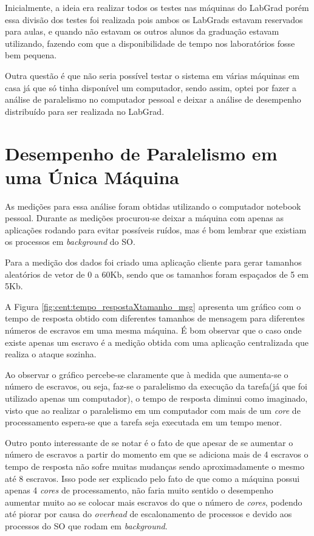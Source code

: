 \documentclass[
	12pt,				%
    oneside,			%
	a4paper,			%
	english,			%
	brazil,				%
	]{abntex2}
\begin{document}
Inicialmente, a ideia era realizar todos os testes nas máquinas do LabGrad porém essa divisão dos testes foi realizada pois ambos os LabGrads estavam reservados para aulas, e quando não estavam os outros alunos da graduação estavam utilizando, fazendo com que a disponibilidade de tempo nos laboratórios fosse bem pequena. 

Outra questão é que não seria possível testar o sistema em várias máquinas em casa já que só tinha disponível um computador, sendo assim, optei por fazer a análise de paralelismo no computador pessoal e deixar a análise de desempenho distribuído para ser realizada no LabGrad.

\section{Desempenho de Paralelismo em uma Única Máquina}

As medições para essa análise foram obtidas utilizando o computador notebook pessoal. Durante as medições procurou-se deixar
a máquina com apenas as aplicações rodando para evitar possíveis ruídos, mas é bom lembrar que existiam os processos em \textit{background} do SO. 

Para a medição dos dados foi criado uma aplicação cliente para gerar tamanhos aleatórios de vetor de 0 a 60Kb, sendo que os
tamanhos foram espaçados de 5 em 5Kb.

A Figura \ref{fig:cent:tempo_respostaXtamanho_msg} apresenta um gráfico com o tempo de resposta obtido com diferentes tamanhos de mensagem para diferentes números de escravos em uma mesma máquina. É bom observar que o caso onde existe apenas um escravo é a medição obtida com uma aplicação centralizada que realiza o ataque sozinha.

Ao observar o gráfico percebe-se claramente que à medida que aumenta-se o número de escravos, ou seja, faz-se o paralelismo da 
execução da tarefa(já que foi utilizado apenas um computador), o tempo de resposta diminui como imaginado, visto que ao
realizar o paralelismo em um computador com mais de um \textit{core} de processamento espera-se que a tarefa seja executada
em um tempo menor.

Outro ponto interessante de se notar é o fato de que apesar de se aumentar o número de escravos a partir do momento em que se adiciona mais de 4 escravos o tempo de resposta não sofre muitas mudanças sendo aproximadamente o mesmo até 8 escravos. Isso
pode ser explicado pelo fato de que como a máquina possui apenas 4 \textit{cores} de processamento, não faria muito sentido o desempenho aumentar muito ao se colocar mais escravos do que o número de \textit{cores}, podendo até piorar por causa do \textit{overhead} de escalonamento de processos e devido aos processos do SO que rodam em \textit{background}.
\end{document}
